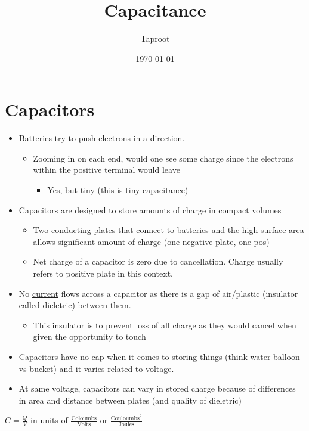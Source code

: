 \documentclass[letterpaper]{article}
\author{Taproot}
\date{\today}
\title{Capacitance}
\renewcommand\maketitle{}
\begin{document}
\maketitle

\section{Capacitors}
\label{sec:org5d591e4}
\begin{itemize}
\item Batteries try to push electrons in a direction.
\begin{itemize}
\item Zooming in on each end, would one see some charge since the electrons within the positive terminal would leave
\begin{itemize}
\item Yes, but tiny (this is tiny capacitance)
\end{itemize}
\end{itemize}
\item Capacitors are designed to store amounts of charge in compact volumes
\begin{itemize}
\item Two conducting plates that connect to batteries and the high surface area allows significant amount of charge (one negative plate, one pos)
\item Net charge of a capacitor is zero due to cancellation. Charge usually refers to positive plate in this context.
\end{itemize}
\item No \href{20200909105807-current.org}{current} flows across a capacitor as there is a gap of air/plastic (insulator called dieletric) between them. 
\begin{itemize}
\item This insulator is to prevent loss of all charge as they would cancel when given the opportunity to touch
\end{itemize}
\item Capacitors have no cap when it comes to storing things (think water balloon vs bucket) and it varies related to voltage.
\item At same voltage, capacitors can vary in stored charge because of differences in area and distance between plates (and quality of dieletric)
\end{itemize}

\(C = \frac{Q}{V}\) in units of \(\frac{\text{Coloumbs}}{\text{Volts}}\) or \(\frac{\text{Couloumbs}^2}{\text{Joules}}\)
\end{document}
